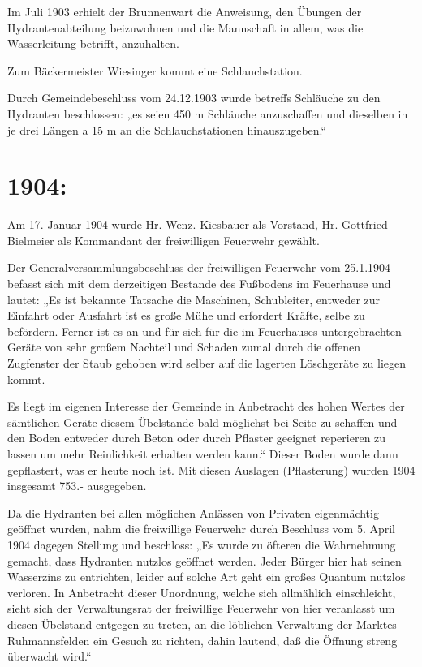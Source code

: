 \documentclass[12pt,a4paper]{book}
\begin{document}
Im Juli 1903 erhielt der Brunnenwart die Anweisung, den Übungen der
Hydrantenabteilung beizuwohnen und die Mannschaft in allem, was die
Wasserleitung betrifft, anzuhalten.

Zum Bäckermeister Wiesinger kommt eine Schlauchstation.

Durch Gemeindebeschluss vom 24.12.1903 wurde betreffs Schläuche zu den Hydranten
beschlossen: „es seien 450 m Schläuche anzuschaffen und dieselben in je drei
Längen a 15 m an die Schlauchstationen hinauszugeben.“

\section{1904:}

Am 17. Januar 1904 wurde Hr. Wenz. Kiesbauer als Vorstand, Hr. Gottfried
Bielmeier als Kommandant der freiwilligen Feuerwehr gewählt.

Der Generalversammlungsbeschluss der freiwilligen Feuerwehr vom 25.1.1904
befasst sich mit dem derzeitigen Bestande des Fußbodens im Feuerhause und
lautet: „Es ist bekannte Tatsache die Maschinen, Schubleiter, entweder zur
Einfahrt oder Ausfahrt ist es große Mühe und erfordert Kräfte, selbe zu
befördern. Ferner ist es an und für sich für die im Feuerhauses untergebrachten
Geräte von sehr großem Nachteil und Schaden zumal durch die offenen Zugfenster
der Staub gehoben wird selber auf die lagerten Löschgeräte zu liegen kommt.

Es liegt im eigenen Interesse der Gemeinde in Anbetracht des hohen Wertes der
sämtlichen Geräte diesem Übelstande bald möglichst bei Seite zu schaffen und den
Boden entweder durch Beton oder durch Pflaster geeignet reperieren zu lassen um
mehr Reinlichkeit erhalten werden kann.“ Dieser Boden wurde dann gepflastert,
was er heute noch ist. Mit diesen Auslagen (Pflasterung) wurden 1904 insgesamt
753.- ausgegeben.

Da die Hydranten bei allen möglichen Anlässen von Privaten eigenmächtig geöffnet
wurden, nahm die freiwillige Feuerwehr durch Beschluss vom 5. April 1904 dagegen
Stellung und beschloss: „Es wurde zu öfteren die Wahrnehmung gemacht, dass
Hydranten nutzlos geöffnet werden. Jeder Bürger hier hat seinen Wasserzins zu
entrichten, leider auf solche Art geht ein großes Quantum nutzlos verloren. In
Anbetracht dieser Unordnung, welche sich allmählich einschleicht, sieht sich der
Verwaltungsrat der freiwillige Feuerwehr von hier veranlasst um diesen Übelstand
entgegen zu treten, an die löblichen Verwaltung der Marktes Ruhmannsfelden ein
Gesuch zu richten, dahin lautend, daß die Öffnung streng überwacht wird.“
\end{document}
